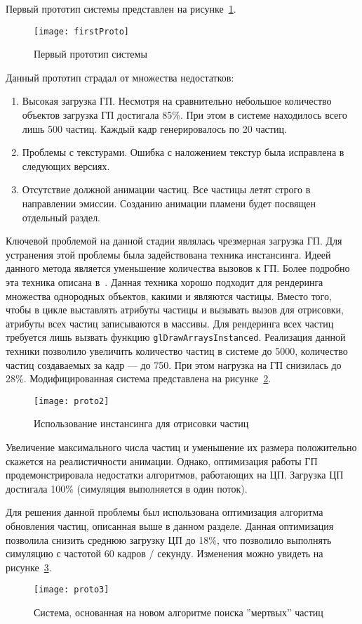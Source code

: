 Первый прототип системы представлен на рисунке~\ref{fig:firstProto}.
\begin{figure}[htb]
	\centering
    \texttt{[image: firstProto]}
    \caption{Первый прототип системы}%
    \label{fig:firstProto}
\end{figure}
Данный прототип страдал от множества недостатков:
\begin{enumerate}
    \item Высокая загрузка ГП. Несмотря на сравнительно небольшое количество
        объектов загрузка ГП достигала 85\%. При этом в системе находилось всего
        лишь 500 частиц. Каждый кадр генерировалось по 20 частиц.
    \item Проблемы с текстурами. Ошибка с наложением текстур была исправлена в
        следующих версиях.
    \item Отсутствие должной анимации частиц. Все частицы летят строго в
        направлении эмиссии. Созданию анимации пламени будет посвящен отдельный
        раздел.
\end{enumerate}

Ключевой проблемой на данной стадии являлась чрезмерная загрузка ГП. Для
устранения этой проблемы была задействована техника инстансинга. Идеей данного
метода является уменьшение количества вызовов к ГП. Более подробно
эта техника описана в~\cite{OGLSuperbible,LearnOGL}. Данная техника хорошо
подходит для рендеринга множества однородных объектов, какими и являются
частицы. Вместо того, чтобы в цикле выставлять атрибуты частицы и вызывать вызов
для отрисовки, атрибуты всех частиц записываются в массивы. Для рендеринга всех
частиц требуется лишь вызвать функцию \texttt{glDrawArraysInstanced}. Реализация
данной техники позволило увеличить количество частиц в системе до 5000,
количество частиц создаваемых за кадр --- до 750. При этом нагрузка на ГП
снизилась до 28\%. Модифицированная система представлена на
рисунке~\ref{fig:proto2}.
\begin{figure}[htb]
	\centering
    \texttt{[image: proto2]}
    \caption{Использование инстансинга для отрисовки частиц}%
    \label{fig:proto2}
\end{figure}

Увеличение максимального числа частиц и уменьшение их размера положительно
скажется на реалистичности анимации. Однако, оптимизация работы ГП
продемонстрировала недостатки алгоритмов, работающих на ЦП. Загрузка ЦП
достигала 100\% (симуляция выполняется в один поток).

Для решения данной проблемы был использована оптимизация алгоритма обновления
частиц, описанная выше в данном разделе. Данная оптимизация позволила снизить
среднюю загрузку ЦП до 18\%, что позволило выполнять симуляцию с частотой 60
кадров / секунду. Изменения можно увидеть на рисунке~\ref{fig:proto3}.
\begin{figure}[htb]
	\centering
    \texttt{[image: proto3]}
    \caption{Система, основанная на новом алгоритме поиска ''мертвых'' частиц}%
    \label{fig:proto3}
\end{figure}

